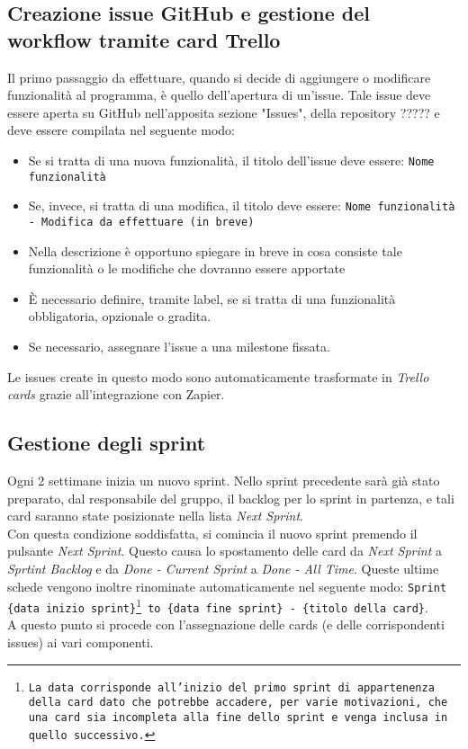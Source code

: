 \subsection{Creazione issue GitHub e gestione del workflow tramite card Trello}
Il primo passaggio da effettuare, quando si decide di aggiungere o modificare funzionalità al programma, è quello dell'apertura di un'issue.
Tale issue deve essere aperta su GitHub nell'apposita sezione "Issues", della repository ????? e deve essere compilata nel seguente modo:
\begin{itemize}
    \item Se si tratta di una nuova funzionalità, il titolo dell'issue deve essere: \texttt{Nome funzionalità}
    \item Se, invece, si tratta di una modifica, il titolo deve essere:
    \texttt{Nome funzionalità - Modifica da effettuare (in breve)}
    \item Nella descrizione è opportuno spiegare in breve in cosa consiste tale funzionalità o le modifiche che dovranno essere apportate
    \item È necessario definire, tramite label, se si tratta di una funzionalità obbligatoria, opzionale o gradita.
    \item Se necessario, assegnare l'issue a una milestone fissata.
\end{itemize}
Le issues create in questo modo sono automaticamente trasformate in \textit{Trello cards} grazie all'integrazione con Zapier.
\subsection{Gestione degli sprint}
Ogni 2 settimane inizia un nuovo sprint. Nello sprint precedente sarà già stato preparato, dal responsabile del gruppo, il backlog per lo sprint in partenza, e tali card saranno state posizionate nella lista \textit{Next Sprint}. \\
Con questa condizione soddisfatta, si comincia il nuovo sprint premendo il pulsante \textit{Next Sprint}. Questo causa lo spostamento delle card da \textit{Next Sprint} a \textit{Sprtint Backlog} e da \textit{Done - Current Sprint} a \textit{Done - All Time}. Queste ultime schede vengono inoltre rinominate automaticamente nel seguente modo: \texttt{Sprint \{data inizio sprint\}\footnote{La data corrisponde all'inizio del primo sprint di appartenenza della card dato che potrebbe accadere, per varie motivazioni, che una card sia incompleta alla fine dello sprint e venga inclusa in quello successivo.} to \{data fine sprint\} - \{titolo della card\}}.\\
A questo punto si procede con l'assegnazione delle cards (e delle corrispondenti issues) ai vari componenti.
